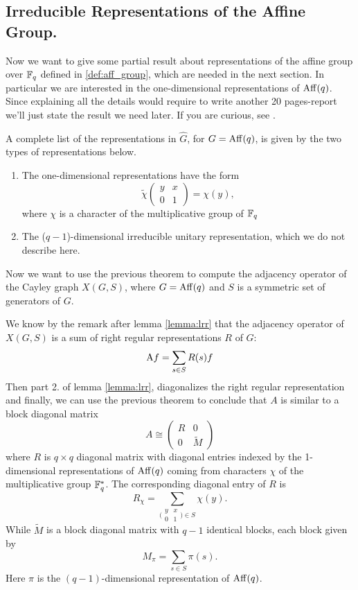 \subsection{ Irreducible Representations of the Affine Group.}
Now we want to give some partial result about representations of the affine group over ${\mathbb F}_q$ defined in \eqref{def:aff_group}, which are needed in the next section. In particular we are interested in the one-dimensional representations of $\operatorname{Aff}(q)$. Since explaining all the details would require to write another 20 pages-report we'll just state the result we need later. If you are curious, see \cite[Chapters~16-17]{terras_1999}.
\begin{theorem}\label{thm:eigen}
A complete  list  of  the representations  in $\hat{G}$, for $G=\operatorname{Aff}(q)$, is  given  by the two types  of representations  below.
\begin{enumerate}
\item The one-dimensional representations have the form
\[
\widetilde{\chi}
\begin{pmatrix}
y &x\\
0 &1
\end{pmatrix}
=\chi(y),
\]
where $\chi$ is a character of the multiplicative group of ${\mathbb F}_q$
\item The ($q-1$)-dimensional  irreducible unitary representation, which we do not describe here.
\end{enumerate}

\end{theorem}
Now we want to use the previous theorem to compute the adjacency operator of  the Cayley graph $X(G,S)$, where $G=\operatorname{Aff}(q)$ and $S$ is a symmetric set of generators of $G$.

We know by the remark after lemma \ref{lemma:lrr} that the  adjacency operator of $X(G,S)$ is a sum  of right regular representations $R$ of $G$:
\[
\operatorname{A\!} f = \sum_{s\in S}R(s)f 
\]
Then part 2. of lemma \ref{lemma:lrr}, diagonalizes the right regular representation and finally, we can use the previous theorem to conclude that $A$ is similar to a block diagonal matrix
\[
A\cong \begin{pmatrix}
R &0 \\
0 &\widetilde{M}
\end{pmatrix}
\] 
where $R$ is $q\times q$ diagonal matrix with diagonal entries indexed  by  the  1-dimensional representations  of $\operatorname{Aff}(q)$ coming  from  characters $\chi$  of the multiplicative group ${\mathbb F}_q^{*}$. The corresponding  diagonal entry  of $R$ is 
\[
R_\chi=\sum_{\bigl(\begin{smallmatrix}
y &x\\
0 &1
\end{smallmatrix}\bigr) \in S }\chi(y).
\]
While $\widetilde{M}$   is a block diagonal matrix with $q-1$ identical blocks, each block given by
\[
M_\pi=\sum_{s\in S}\pi(s).
\]
Here $\pi$ is the $(q-1)$-dimensional representation of $\operatorname{Aff}(q)$.